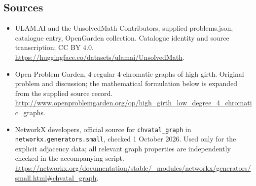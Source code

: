 \documentclass[11pt,a4paper]{article}
\begin{document}
\subsection{Sources}
\begin{itemize}
\item[S1] ULAM.AI and the UnsolvedMath Contributors, supplied problems.json, catalogue entry, OpenGarden collection. Catalogue identity and source transcription; CC BY 4.0.
\url{https://huggingface.co/datasets/ulamai/UnsolvedMath}.
\item[S2] Open Problem Garden, 4-regular 4-chromatic graphs of high girth. Original problem and discussion; the mathematical formulation below is expanded from the supplied source record.
\url{http://www.openproblemgarden.org/op/high_girth_low_degree_4_chromatic_graphs}.
\item[S3] NetworkX developers, official source for \texttt{chvatal\_graph} in \texttt{networkx.generators.small}, checked 1 October 2026. Used only for the explicit adjacency data; all relevant graph properties are independently checked in the accompanying script.
\url{https://networkx.org/documentation/stable/_modules/networkx/generators/small.html#chvatal_graph}.
\end{itemize}
\end{document}
